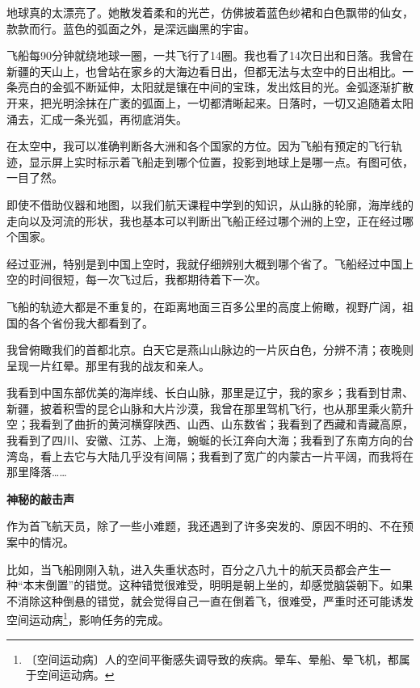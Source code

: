 \documentclass[12pt,UTF-8,openany]{ctexbook}
\begin{document}
\begin{normalsize}
    地球真的太漂亮了。她散发着柔和的光芒，仿佛披着蓝色纱裙和白色飘带的仙女，款款而行。蓝色的弧面之外，是深远幽黑的宇宙。
    
    飞船每90分钟就绕地球一圈，一共飞行了14圈。我也看了14次日出和日落。我曾在新疆的天山上，也曾站在家乡的大海边看日出，但都无法与太空中的日出相比。一条亮白的金弧不断延伸，太阳就是镶在中间的宝珠，发出炫目的光。金弧逐渐扩散开来，把光明涂抹在广袤的弧面上，一切都清晰起来。日落时，一切又追随着太阳涌去，汇成一条光弧，再彻底消失。
    
    在太空中，我可以准确判断各大洲和各个国家的方位。因为飞船有预定的飞行轨迹，显示屏上实时标示着飞船走到哪个位置，投影到地球上是哪一点。有图可依，一目了然。
    
    即使不借助仪器和地图，以我们航天课程中学到的知识，从山脉的轮廓，海岸线的走向以及河流的形状，我也基本可以判断出飞船正经过哪个洲的上空，正在经过哪个国家。
    
    经过亚洲，特别是到中国上空时，我就仔细辨别大概到哪个省了。飞船经过中国上空的时间很短，每一次飞过后，我都期待着下一次。
    
    飞船的轨迹大都是不重复的，在距离地面三百多公里的高度上俯瞰，视野广阔，祖国的各个省份我大都看到了。
    
    我曾俯瞰我们的首都北京。白天它是燕山山脉边的一片灰白色，分辨不清；夜晚则呈现一片红晕。那里有我的战友和亲人。
    
    我看到中国东部优美的海岸线、长白山脉，那里是辽宁，我的家乡；我看到甘肃、新疆，披着积雪的昆仑山脉和大片沙漠，我曾在那里驾机飞行，也从那里乘火箭升空；我看到了曲折的黄河横穿陕西、山西、山东数省；我看到了西藏和青藏高原，我看到了四川、安徽、江苏、上海，蜿蜒的长江奔向大海；我看到了东南方向的台湾岛，看上去它与大陆几乎没有间隔；我看到了宽广的内蒙古一片平阔，而我将在那里降落……
    
    \begin{center}
    
    \begin{large}\textbf{神秘的敲击声}\end{large}
    
    \end{center}
    
    作为首飞航天员，除了一些小难题，我还遇到了许多突发的、原因不明的、不在预案中的情况。
    
    比如，当飞船刚刚入轨，进入失重状态时，百分之八九十的航天员都会产生一种“本末倒置”的错觉。这种错觉很难受，明明是朝上坐的，却感觉脑袋朝下。如果不消除这种倒悬的错觉，就会觉得自己一直在倒着飞，很难受，严重时还可能诱发空间运动病\footnote{〔空间运动病〕人的空间平衡感失调导致的疾病。晕车、晕船、晕飞机，都属于空间运动病。}，影响任务的完成。
    

\end{normalsize}
\end{document}
